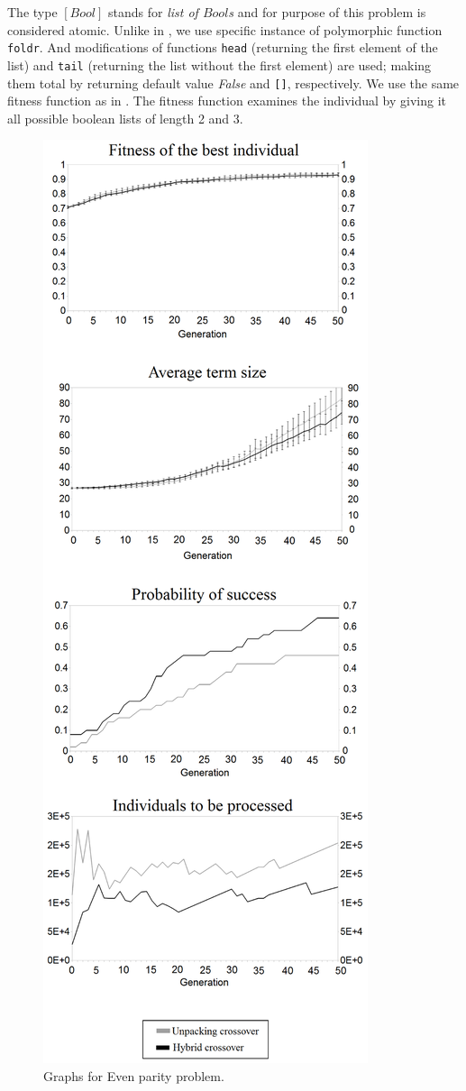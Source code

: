 \documentclass{sig-alternate}
\begin{document}
The type $[Bool]$ stands for \textit{list of $Bool$s} and for purpose of
this problem is considered atomic.
Unlike in \cite{yu01}, we use specific instance of polymorphic 
function \texttt{foldr}. 
And modifications of functions \texttt{head} 
(returning the first element of the list) 
and \texttt{tail} (returning the list without the first element) are used; 
making them total by returning default value \textit{False}
and \texttt{[]}, respectively.
We use the same fitness function as in \cite{yu01}. 
The fitness function examines the individual by giving
it all possible boolean lists of length 2 and 3.

\begin{figure}[!ht]
  \centering
  \caption{Graphs for Even parity problem.}
  \includegraphics[scale=0.17]{EP.eps} %
\end{figure}
\end{document}
